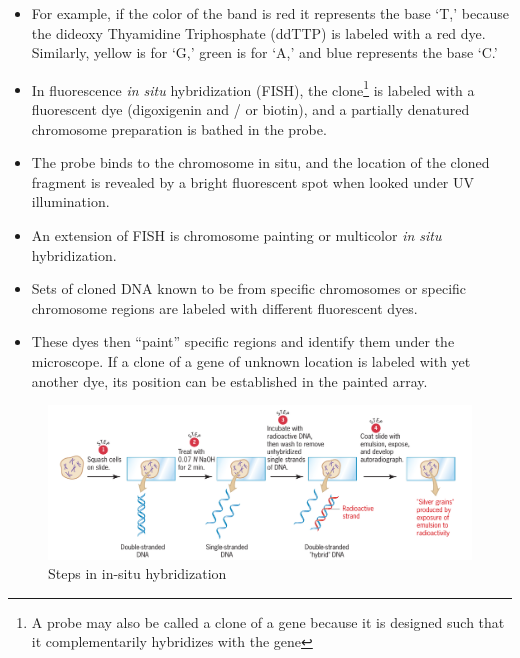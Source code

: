 \documentclass[11pt,dvipsnames,ignorenonframetext,aspectratio=169]{beamer}
\providecommand{\tightlist}{%
  \setlength{\itemsep}{0pt}\setlength{\parskip}{0pt}}
\begin{document}
\begin{frame}{}
\protect\hypertarget{section-4}{}
\begin{itemize}
\tightlist
\item
  For example, if the color of the band is red it represents the base
  `T,' because the dideoxy Thyamidine Triphosphate (ddTTP) is labeled
  with a red dye. Similarly, yellow is for `G,' green is for `A,' and
  blue represents the base `C.'
\item
  In fluorescence \emph{in situ} hybridization (FISH), the
  clone\footnote[frame]{A probe may also be called a clone of a gene because it is designed such that it complementarily hybridizes with the gene}
  is labeled with a fluorescent dye (digoxigenin and / or biotin), and a
  partially denatured chromosome preparation is bathed in the probe.
\end{itemize}
\end{frame}

\begin{frame}{}
\protect\hypertarget{section-5}{}
\begin{itemize}
\tightlist
\item
  The probe binds to the chromosome in situ, and the location of the
  cloned fragment is revealed by a bright fluorescent spot when looked
  under UV illumination.
\item
  An extension of FISH is chromosome painting or multicolor \emph{in
  situ} hybridization.
\item
  Sets of cloned DNA known to be from specific chromosomes or specific
  chromosome regions are labeled with different fluorescent dyes.
\item
  These dyes then ``paint'' specific regions and identify them under the
  microscope. If a clone of a gene of unknown location is labeled with
  yet another dye, its position can be established in the painted array.
\end{itemize}
\end{frame}

\begin{frame}{}
\protect\hypertarget{section-6}{}
\begin{figure}
\includegraphics[width=0.7\linewidth]{./../images/insitu_hybrid_steps} \caption{Steps in in-situ hybridization}\label{fig:insitu-hybridization}
\end{figure}
\end{frame}
\end{document}
